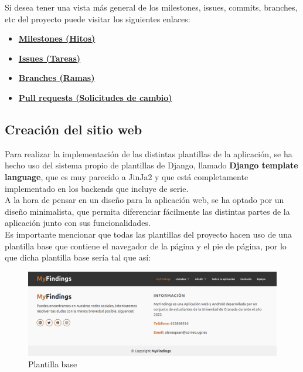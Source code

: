 Si desea tener una vista más general de los milestones, issues, commits, branches, etc del
proyecto puede visitar los siguientes enlaces:

\begin{itemize}
    \item \textbf{\href{https://github.com/alexespana/TFG/milestones}{Milestones (Hitos)}}
    \item \textbf{\href{https://github.com/alexespana/TFG/issues}{Issues (Tareas)}}
    \item \textbf{\href{https://github.com/alexespana/TFG/branches}{Branches (Ramas)}}
    \item \textbf{\href{https://github.com/alexespana/TFG/pulls}{Pull requests (Solicitudes
    de cambio)}}
\end{itemize}


\subsection{Creación del sitio web}
Para realizar la implementación de las distintas plantillas de la aplicación, se ha hecho
uso del sistema propio de plantillas de Django, llamado \textbf{Django template language},
que es muy parecido a JinJa2 y que está completamente implementado en los backends que
incluye de serie.\\

A la hora de pensar en un diseño para la aplicación web, se ha optado por un diseño
minimalista, que permita diferenciar fácilmente las distintas partes de la aplicación
junto con sus funcionalidades.\\

Es importante mencionar que todas las plantillas del proyecto hacen uso de una plantilla
base que contiene el navegador de la página y el pie de página, por lo que dicha plantilla base
sería tal que así:\\

    \begin{figure}[H]
        \centering
        \includegraphics[scale=0.25]{imagenes/base.png}
        \caption{Plantilla base}
        \label{fig:base}
    \end{figure}


